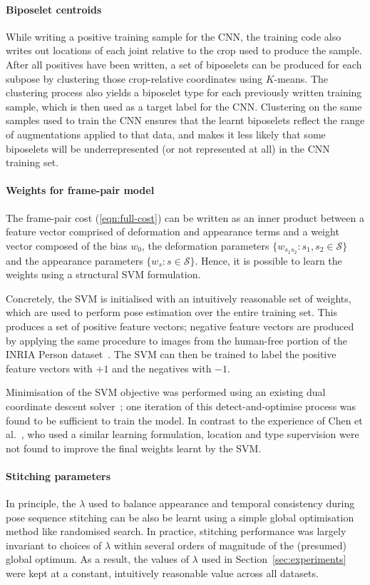 \documentclass[runningheads]{llncs}
\begin{document}
\paragraph{Biposelet centroids} While writing a positive training sample for the
CNN, the training code also writes out locations of each joint relative to the
crop used to produce the sample. After all positives have been written, a set of
biposelets can be produced for each subpose by clustering those crop-relative
coordinates using $K$-means. The clustering process also yields a biposelet type
for each previously written training sample, which is then used as a target
label for the CNN\@. Clustering on the same samples used to train the CNN ensures
that the learnt biposelets reflect the range of augmentations applied to that
data, and makes it less likely that some biposelets will be underrepresented (or
not represented at all) in the CNN training set.

\paragraph{Weights for frame-pair model} The frame-pair cost
(\ref{eqn:full-cost}) can be written as an inner product between a feature
vector comprised of deformation and appearance terms and a weight vector
composed of the bias $w_0$, the deformation parameters $\{w_{s_1 s_2} : s_1, s_2
\in \mathcal S\}$ and the appearance parameters $\{w_s : s \in \mathcal S\}$.
Hence, it is possible to learn the weights using a structural SVM formulation.

Concretely, the SVM is initialised with an intuitively reasonable set of
weights, which are used to perform pose estimation over the entire training set.
This produces a set of positive feature vectors; negative feature vectors are
produced by applying the same procedure to images from the human-free portion of
the INRIA Person dataset~\cite{dalal2005histograms}. The SVM can then be trained
to label the positive feature vectors with $+1$ and the negatives with $-1$.

Minimisation of the SVM objective was performed using an existing dual
coordinate descent solver~\cite{ramanan2013dual}; one iteration of this
detect-and-optimise process was found to be sufficient to train the model. In
contrast to the experience of Chen et al.~\cite{chen2014articulated}, who used a
similar learning formulation, location and type supervision were not found to
improve the final weights learnt by the SVM.

\paragraph{Stitching parameters} In principle, the $\lambda$ used to balance
appearance and temporal consistency during pose sequence stitching can be also
be learnt using a simple global optimisation method like randomised search. In
practice, stitching performance was largely invariant to choices of $\lambda$
within several orders of magnitude of the (presumed) global optimum. As a
result, the values of $\lambda$ used in Section~\ref{sec:experiments} were kept
at a constant, intuitively reasonable value across all datasets.
\end{document}
